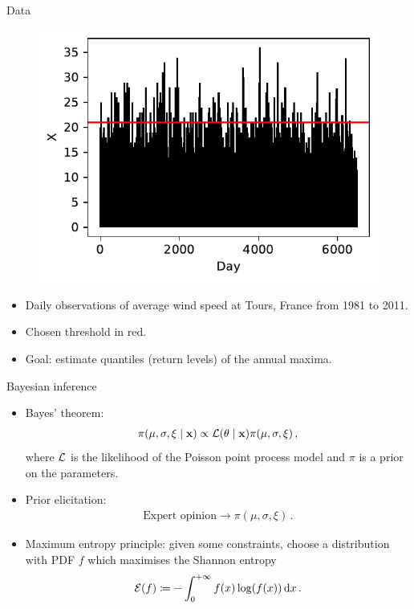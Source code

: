 \documentclass[10pt]{beamer}
\newcommand{\dd}{{\rm d}}
\begin{document}
%
%
\begin{frame}{Data}{}
%
\begin{figure}
	\centering
	\includegraphics[width=0.5\linewidth]{plots/data.pdf}
\end{figure}
%
\begin{itemize}
	\item Daily observations of average wind speed
		at Tours, France from 1981 to 2011.
	\item Chosen threshold in red.
	\item Goal: estimate quantiles (return levels) of the annual maxima.
\end{itemize}
%
\end{frame}
%
%
\begin{frame}{Bayesian inference}{}
%
\begin{itemize}
	\item Bayes' theorem:
		\begin{align*}
			\pi(\mu, \sigma, \xi \mid \mathbf{x}) \propto {\cal L}(\theta \mid \mathbf{x}) \pi(\mu, \sigma, \xi) \,,
		\end{align*}
		where ${\cal L}$ is the likelihood of the Poisson point process model
		and $\pi$ is a prior on the parameters.
	\item Prior elicitation:
		\begin{align*}
			\text{Expert opinion} \longrightarrow \pi(\mu, \sigma, \xi) \,.
		\end{align*}
	\item Maximum entropy principle: given some constraints,
		choose a distribution with PDF $f$ which maximises the Shannon entropy
		\begin{align*}
			{\cal E}(f) \coloneqq -\int_0^{+\infty} f(x) \log(f(x)) \, \dd x \,.
		\end{align*}
\end{itemize}
%
\end{frame}
%
\end{document}
